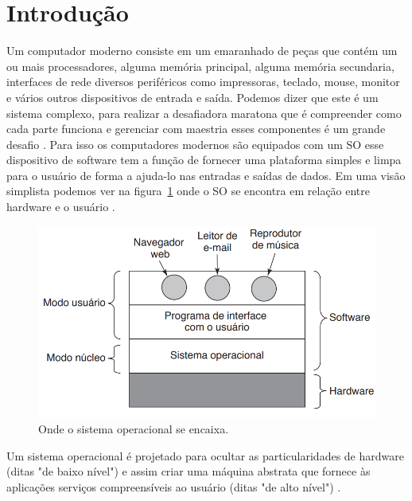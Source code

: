 
\chapter*[Introdução]{Introdução}

Um computador moderno consiste em um emaranhado de peças que contém um ou mais processadores, alguma memória principal, alguma memória secundaria, interfaces de rede diversos periféricos como impressoras, teclado, mouse, monitor e vários outros dispositivos de entrada e saída. Podemos dizer que este é um sistema complexo, para realizar a desafiadora maratona que é compreender como cada parte funciona e gerenciar com maestria esses componentes é um grande desafio \cite{Tanenbaum2016}.
Para isso os computadores modernos são equipados com um SO esse dispositivo de software tem a função de fornecer uma plataforma simples e limpa para o usuário de forma a ajuda-lo nas entradas e saídas de dados. Em uma visão simplista podemos ver na figura~\ref{fig:figura1} onde o SO se encontra em relação entre hardware e o usuário \cite{Tanenbaum2016}. 

\begin{figure}[htpb]
    \centering
   \includegraphics[scale=.4]{imagens/figura1.png}
   \caption{Onde o sistema operacional se encaixa. \cite{Tanenbaum2016}}
   \label{fig:figura1}
\end{figure}

Um sistema operacional é projetado para ocultar as particularidades de hardware (ditas "de baixo nível") e assim criar uma máquina abstrata que fornece às aplicações serviços compreensíveis ao usuário (ditas "de alto nível") \cite{Comer2012}.

